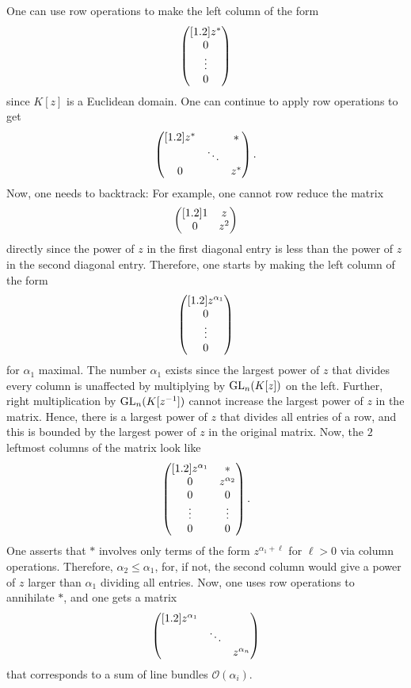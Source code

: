 \documentclass [11 pt, oneside] {article}
\begin{document}
One can use row operations to make the left column of the form
\begin{align*}
	\begin{pmatrix} [1.2] z^{*} \\ 0\\ \vdots\\ 0\end{pmatrix}
\end{align*}
since $K[z]$ is a Euclidean domain. One can continue to apply row operations to get
\begin{align*}
	\begin{pmatrix} [1.2] z^{*}&&*\\ & \ddots\\ 0&&z^{*}\end{pmatrix}.
\end{align*}
Now, one needs to backtrack: For example, one cannot row reduce the matrix
\begin{align*}
	\begin{pmatrix} [1.2] 1&z\\0&z^2\end{pmatrix}
\end{align*}
directly since the power of $z$ in the first diagonal entry is less than the power of $z$ in the second diagonal entry. Therefore, one starts by making the left column of the form
\begin{align*}
	\begin{pmatrix} [1.2] z^{\alpha_1}\\0\\\vdots \\ 0\end{pmatrix}
\end{align*}
for $\alpha_1$ maximal. The number $\alpha_1$ exists since the largest power of $z$ that divides every column is unaffected by multiplying by $\operatorname{GL}_{n}(K[z])$ on the left. Further, right multiplication by $\operatorname{GL}_{n}(K[z^{-1}])$ cannot increase the largest power of $z$ in the matrix. Hence, there is a largest power of $z$ that divides all entries of a row, and this is bounded by the largest power of $z$ in the original matrix. Now, the $2$ leftmost columns of the matrix look like
\begin{align*}
	\begin{pmatrix} [1.2] z^{\alpha_1}&*\\
		0&z^{\alpha_2}\\
		0&0\\
		\vdots&\vdots\\
		0&0\end{pmatrix}.
\end{align*}
One asserts that $*$ involves only terms of the form $z^{\alpha_1+\ell}$ for $\ell>0$ via column operations. Therefore, $\alpha_2\le \alpha_1$, for, if not, the second column would give a power of $z$ larger than $\alpha_1$ dividing all entries. Now, one uses row operations to annihilate $*$, and one gets a matrix
\begin{align*}
	\begin{pmatrix} [1.2] z^{\alpha_1}\\&\ddots \\&&z^{\alpha_n}\end{pmatrix}
\end{align*}
that corresponds to a sum of line bundles $\mathscr{O}(\alpha_i)$. 
\end{document}

